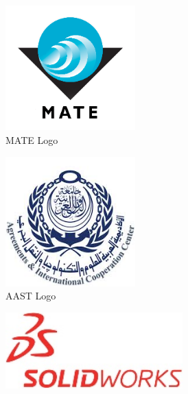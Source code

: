 \begin{figure}[hb!]
    \centering
    \begin{subfigure}[b]{0.38\columnwidth}
        \centering
        \includegraphics[width=0.55\textwidth]{Sections/6Conclusion/images/MATE_logo.png}
        \caption{MATE Logo}
    \end{subfigure}
    \begin{subfigure}{0.38\columnwidth}
        \centering
        \includegraphics[width=0.55\textwidth]{Sections/6Conclusion/images/AAST_logo.png}
        \caption{AAST Logo}
    \end{subfigure}
    \begin{subfigure}[b]{0.38\columnwidth}
        \centering
        \includegraphics[width=0.75\textwidth]{Sections/6Conclusion/images/solidworks_logo.png}

\end{subfigure}
\end{figure}
